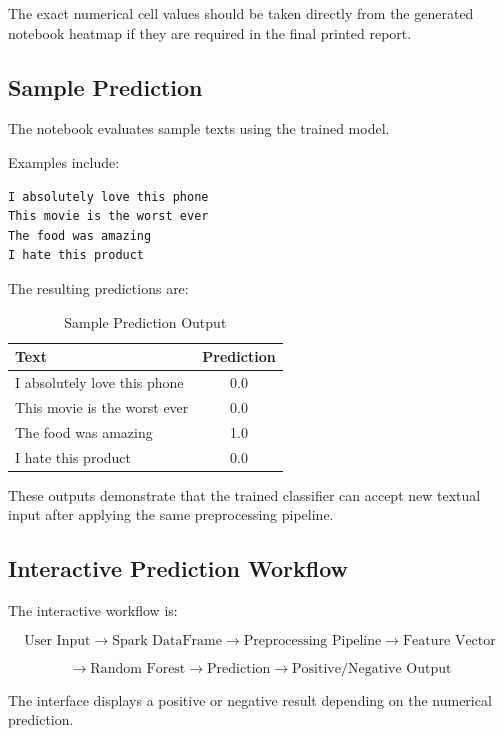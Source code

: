 \documentclass[12pt,a4paper]{article}
\begin{document}
The exact numerical cell values should be taken directly from the generated notebook heatmap if they are required in the final printed report.


\subsection{Sample Prediction}

The notebook evaluates sample texts using the trained model.

Examples include:

\begin{lstlisting}
I absolutely love this phone
This movie is the worst ever
The food was amazing
I hate this product
\end{lstlisting}

The resulting predictions are:

\begin{table}[H]
\centering
\caption{Sample Prediction Output}
\begin{tabular}{p{9cm}c}
\toprule
\textbf{Text} & \textbf{Prediction} \\
\midrule
I absolutely love this phone & 0.0 \\
This movie is the worst ever & 0.0 \\
The food was amazing & 1.0 \\
I hate this product & 0.0 \\
\bottomrule
\end{tabular}
\end{table}

These outputs demonstrate that the trained classifier can accept new textual input after applying the same preprocessing pipeline.




\subsection{Interactive Prediction Workflow}

The interactive workflow is:

\[
\text{User Input}
\rightarrow
\text{Spark DataFrame}
\rightarrow
\text{Preprocessing Pipeline}
\rightarrow
\text{Feature Vector}
\]

\[
\rightarrow
\text{Random Forest}
\rightarrow
\text{Prediction}
\rightarrow
\text{Positive/Negative Output}
\]

The interface displays a positive or negative result depending on the numerical prediction.
\end{document}

